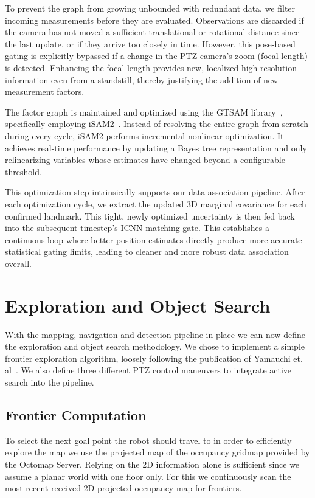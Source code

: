\documentclass[
	parspace, %
	noindent, %
	final, %
]{elteikthesis}
\begin{document}
To prevent the graph from growing unbounded with redundant data, we filter incoming measurements before they are evaluated. Observations are discarded if the camera has not moved a sufficient translational or rotational distance since the last update, or if they arrive too closely in time. However, this pose-based gating is explicitly bypassed if a change in the PTZ camera's zoom (focal length) is detected. Enhancing the focal length provides new, localized high-resolution information even from a standstill, thereby justifying the addition of new measurement factors.

The factor graph is maintained and optimized using the GTSAM library~\cite{gtsam}, specifically employing iSAM2~\cite{isam2_kaess_2012}. Instead of resolving the entire graph from scratch during every cycle, iSAM2 performs incremental nonlinear optimization. It achieves real-time performance by updating a Bayes tree representation and only relinearizing variables whose estimates have changed beyond a configurable threshold. 

This optimization step intrinsically supports our data association pipeline. After each optimization cycle, we extract the updated 3D marginal covariance for each confirmed landmark. This tight, newly optimized uncertainty is then fed back into the subsequent timestep's ICNN matching gate. This establishes a continuous loop where better position estimates directly produce more accurate statistical gating limits, leading to cleaner and more robust data association overall.

\section{Exploration and Object Search}
With the mapping, navigation and detection pipeline in place we can now define the exploration and object search methodology. We chose to implement a simple frontier exploration algorithm, loosely following the publication of Yamauchi et. al~\cite{frontierbased_yamauchi_1997}. We also define three different PTZ control maneuvers to integrate active search into the pipeline.

\subsection{Frontier Computation}
To select the next goal point the robot should travel to in order to efficiently explore the map we use the projected map of the occupancy gridmap provided by the Octomap Server. Relying on the 2D information alone is sufficient since we assume a planar world with one floor only. For this we continuously scan the most recent received 2D projected occupancy map for frontiers.
\end{document}
